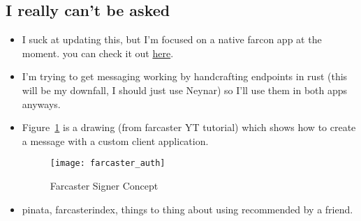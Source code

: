 \subsection*{I really can't be asked}
\begin{itemize}
    \item I suck at updating this, but I'm focused on a native farcon app at the
        moment. you can check it out
        \textcolor{blue}{\href{https://farcon.info}{here}}.
    \item I'm trying to get messaging working by handcrafting endpoints in rust
        (this will be my downfall, I should just use Neynar) so I'll use them in
        both apps anyways.
    \item Figure~\ref{fig:farcaster_auth} is a drawing (from farcaster YT 
        tutorial) which shows how to create a message with a custom client 
        application.
        \begin{figure}[ht]
            \centering
            \texttt{[image: farcaster\_auth]}
            \captionsetup{labelfont=bf, textfont=it}
            \caption{Farcaster Signer Concept}
            \label{fig:farcaster_auth}
        \end{figure}
    \item pinata, farcasterindex, things to thing about using recommended by a
        friend.
\end{itemize}
